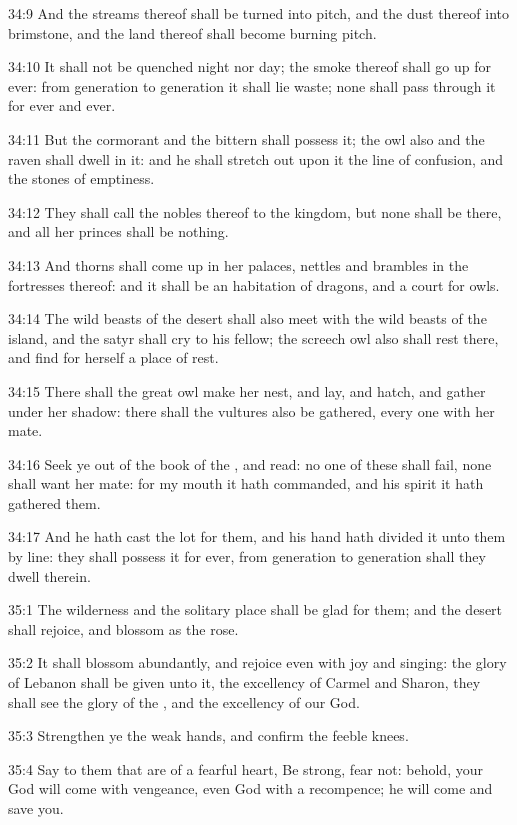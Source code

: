 34:9 And the streams thereof shall be turned into pitch, and the dust thereof into brimstone, and the land thereof shall become burning pitch.

34:10 It shall not be quenched night nor day; the smoke thereof shall go up for ever: from generation to generation it shall lie waste; none shall pass through it for ever and ever.

34:11 But the cormorant and the bittern shall possess it; the owl also and the raven shall dwell in it: and he shall stretch out upon it the line of confusion, and the stones of emptiness.

34:12 They shall call the nobles thereof to the kingdom, but none shall be there, and all her princes shall be nothing.

34:13 And thorns shall come up in her palaces, nettles and brambles in the fortresses thereof: and it shall be an habitation of dragons, and a court for owls.

34:14 The wild beasts of the desert shall also meet with the wild beasts of the island, and the satyr shall cry to his fellow; the screech owl also shall rest there, and find for herself a place of rest.

34:15 There shall the great owl make her nest, and lay, and hatch, and gather under her shadow: there shall the vultures also be gathered, every one with her mate.

34:16 Seek ye out of the book of the \LORD, and read: no one of these shall fail, none shall want her mate: for my mouth it hath commanded, and his spirit it hath gathered them.

34:17 And he hath cast the lot for them, and his hand hath divided it unto them by line: they shall possess it for ever, from generation to generation shall they dwell therein.

35:1 The wilderness and the solitary place shall be glad for them; and the desert shall rejoice, and blossom as the rose.

35:2 It shall blossom abundantly, and rejoice even with joy and singing: the glory of Lebanon shall be given unto it, the excellency of Carmel and Sharon, they shall see the glory of the \LORD, and the excellency of our God.

35:3 Strengthen ye the weak hands, and confirm the feeble knees.

35:4 Say to them that are of a fearful heart, Be strong, fear not: behold, your God will come with vengeance, even God with a recompence; he will come and save you.

